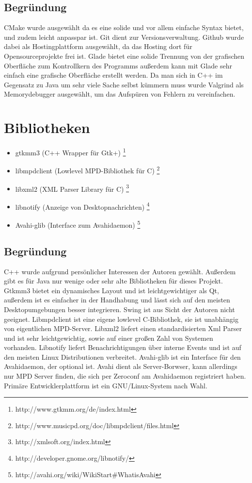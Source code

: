 \subsection{Begründung}
CMake wurde ausgewählt da es eine solide und vor allem einfache Syntax bietet, und zudem leicht anpasspar ist. 
Git dient zur Versionsverwaltung. Github wurde dabei als Hostingplattform ausgewählt, da das Hosting dort für Opensourceprojekte
frei ist. Glade bietet eine solide Trennung von der grafischen  Oberfläche zum Kontrollkern des Programms außerdem kann mit Glade sehr
einfach eine grafische Oberfläche erstellt werden. Da man sich in C++ im Gegensatz zu Java um sehr viele Sache selbst kümmern muss
wurde Valgrind als Memorydebugger ausgewählt, um das Aufspüren von Fehlern zu vereinfachen.
\section{Bibliotheken}
\begin{itemize}
\item gtkmm3 (C++ Wrapper für Gtk+) \footnote{http://www.gtkmm.org/de/index.html}
\item libmpdclient (Lowlevel MPD-Bibliothek für C) \footnote{http://www.musicpd.org/doc/libmpdclient/files.html}
\item libxml2 (XML Parser Library für C) \footnote{http://xmlsoft.org/index.html}
\item libnotify (Anzeige von Desktopnachrichten) \footnote{http://developer.gnome.org/libnotify/}
\item Avahi-glib (Interface zum Avahidaemon) \footnote{http://avahi.org/wiki/WikiStart\#WhatisAvahi}
\end{itemize}
\subsection{Begründung}
C++ wurde aufgrund persönlicher Interessen der Autoren gewählt. Außerdem gibt es für Java nur wenige
oder sehr alte Bibliotheken für dieses Projekt. Gtkmm3 bietet ein dynamisches Layout und ist
leichtgewichtiger als Qt, außerdem ist es einfacher in der Handhabung und lässt sich auf den meisten 
Desktopumgebungen besser integrieren. Swing ist aus Sicht der Autoren nicht geeignet.
Libmpdclient ist eine eigene lowlevel C-Bibliothek, sie ist unabhängig von eigentlichen MPD-Server.
Libxml2 liefert einen standardisierten Xml Parser und ist sehr leichtgewichtig, sowie auf einer großen Zahl von Systemen vorhanden.
Libnotify liefert Benachrichtigungen über interne Events und ist auf den meisten Linux
Distributionen verbreitet. Avahi-glib ist ein Interface für den Avahidaemon, der optional ist. Avahi 
dient als Server-Borwser, kann allerdings nur MPD Server finden, die sich per Zeroconf am Avahidaemon registriert
haben.
\\ 
Primäre Entwicklerplattform ist ein GNU/Linux-System nach Wahl.
